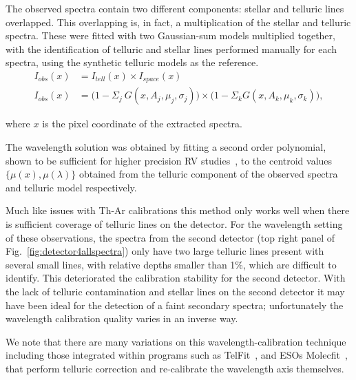 \documentclass[fleqn,usenatbib]{mnras}
\begin{document}
The observed spectra contain two different components: stellar and telluric lines overlapped. This overlapping is, in fact, a multiplication of the stellar and telluric spectra. These were fitted with two Gaussian-sum models multiplied together, with the identification of telluric and stellar lines performed manually for each spectra, using the synthetic telluric models as the reference.
\begin{align}
I_{obs}(x) &= I_{tell}(x) \times I_{space}(x) \nonumber \\
I_{obs}(x) &= \Big(1 - {\Sigma}_{j}\ G(x, A_{j}, {\mu}_{j}, {\sigma}_{j})\Big) \times \Big(1 - {\Sigma}_{k} G(x, A_{k}, {\mu}_{k}, {\sigma}_{k})\Big), \label{eqn:obs}
\end{align}

where \(x \) is the pixel coordinate of the extracted spectra.

The wavelength solution was obtained by fitting a second order polynomial, shown to be sufficient for higher precision RV studies~\citep[e.g.][]{bean_groundbased_2010, figueira_radial_2010}, to the centroid values \(\{\mu(x), \mu(\lambda)\} \) obtained from the telluric component of the observed spectra and telluric model respectively. 

Much like issues with Th-Ar calibrations this method only works well when there is sufficient coverage of telluric lines on the detector. For the wavelength setting of these observations, the spectra from the second detector (top right panel of Fig.~\ref{fig:detector4allspectra}) only have two large telluric lines present with several small lines, with relative depths smaller than 1\%, which are difficult to identify. This deteriorated the calibration stability for the second detector. With the lack of telluric contamination and stellar lines on the second detector it may have been ideal for the detection of a faint secondary spectra; unfortunately the wavelength calibration quality varies in an inverse way.

We note that there are many variations on this wavelength-calibration technique including those integrated within programs such as TelFit~\citet{gullikson_correcting_2014}, and ESOs Molecfit~\citet{smette_molecfit_2015}, that perform telluric correction and re-calibrate the wavelength axis themselves.
\end{document}
